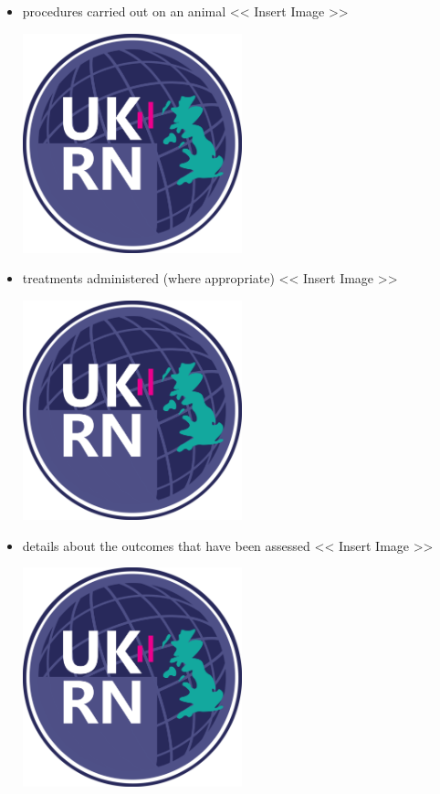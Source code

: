 \documentclass[
]{book}
\providecommand{\tightlist}{%
  \setlength{\itemsep}{0pt}\setlength{\parskip}{0pt}}
\begin{document}
\begin{itemize}
\tightlist
\item
  procedures carried out on an animal
  \textless{}\textless{} Insert Image \textgreater{}\textgreater{}

  \includegraphics[width=0.5\textwidth,height=0.5\textheight]{figs/evidence-triangle.png}
\item
  treatments administered (where appropriate)
  \textless{}\textless{} Insert Image \textgreater{}\textgreater{}

  \includegraphics[width=0.5\textwidth,height=0.5\textheight]{figs/evidence-triangle.png}
\item
  details about the outcomes that have been assessed
  \textless{}\textless{} Insert Image \textgreater{}\textgreater{}

  \includegraphics[width=0.5\textwidth,height=0.5\textheight]{figs/evidence-triangle.png}
\end{itemize}
\end{document}
